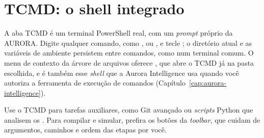 \section{TCMD: o shell integrado}
\label{sec:tcmd}

A aba TCMD é um terminal PowerShell real, com um \textit{prompt} próprio da AURORA. Digite qualquer comando, como ,  ou , e tecle ; o diretório atual e as variáveis de ambiente persistem entre comandos, como num terminal comum. O menu de contexto da árvore de arquivos oferece , que abre o TCMD já na pasta escolhida, e é também esse \textit{shell} que a Aurora Intelligence usa quando você autoriza a ferramenta de execução de comandos (Capítulo~\ref{cap:aurora-intelligence}).

\begin{nota}
Use o TCMD para tarefas auxiliares, como Git avançado ou \textit{scripts} Python que analisem os . Para compilar e simular, prefira os botões da \textit{toolbar}, que cuidam de argumentos, caminhos e ordem das etapas por você.
\end{nota}
